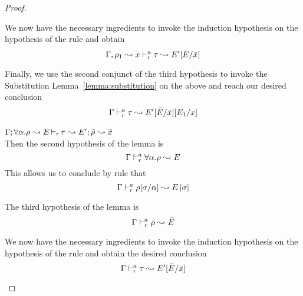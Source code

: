 \begin{proof}
\begin{description}
  We now have the necessary ingredients to invoke the induction hypothesis
  on the hypothesis of the rule and obtain
\begin{equation*}
  \Gamma, \rho_1 \leadsto x \vdash^a_{r} \tau \leadsto E'[\bar{E}/\bar{x}]
\end{equation*}

  Finally, we use the second conjunct of the third hypothesis to invoke
  the Substitution Lemma~\ref{lemma:substitution} on the above and
  reach our desired conclusion
\begin{equation*}
  \Gamma \vdash^a_{r} \tau \leadsto E'[\bar{E}/\bar{x}][E_1/x]
\end{equation*}

\item[\fbox{\texttt{(M-TApp)}}]\quad$\Gamma; \forall\alpha.\rho \leadsto E \mathop{\vdash_{r}} \tau \leadsto E'; \bar{\rho} \leadsto \bar{x}$ \ \\
  Then the second hypothesis of the lemma is
\begin{equation*}
  \Gamma \vdash^a_{r} \forall\alpha.\rho \leadsto E
\end{equation*}
  This allows us to conclude by rule  that
\begin{equation*}
  \Gamma \vdash^a_{r} \rho[\sigma/\alpha] \leadsto E\,|\sigma|
\end{equation*}

  The third hypothesis of the lemma is
\begin{equation*}
  \Gamma \vdash^a_{r} \bar{\rho} \leadsto \bar{E}
\end{equation*}

  We now have the necessary ingredients to invoke the induction hypothesis
  on the hypothesis of the rule and obtain the desired conclusion
\begin{equation*}
  \Gamma \vdash^a_{r} \tau \leadsto E'[\bar{E}/\bar{x}]
\end{equation*}

\end{description}
\end{proof}

